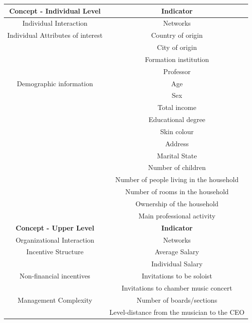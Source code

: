 \documentclass[a4paper, 12pt, openright, oneside, german, french, brazil, english]{abntex2}
\begin{document}
\begin{table}
{\begin{tabular}{|c|c|}
			\hline
			\textbf{Concept - Individual Level} & \textbf{Indicator} \\
			\hline
                   Individual Interaction & Networks \\
			\hline
			Individual Attributes of interest & Country of origin  \\
                                         & City of origin  \\
                                         & Formation institution \\
                                         & Professor    \\
                   \hline
                   Demographic information & Age \\
                                         & Sex \\
                                         & Total income \\
                                         & Educational degree \\
                                         & Skin colour \\
                                         & Address \\
                                         & Marital State \\
                                         & Number of children \\
                                         & Number of people living in the household \\
                                         & Number of rooms in the household \\
                                         & Ownership of the household \\
                                         & Main professional activity \\
                   \hline
                   \textbf{Concept - Upper Level} & \textbf{Indicator} \\
                   \hline
                   Organizational Interaction & Networks \\
                   \hline
                   Incentive Structure & Average Salary \\
                                                            & Individual Salary \\
                   \hline
                   Non-financial incentives & Invitations to be soloist \\
                                                            & Invitations to chamber music concert \\
			\hline
			Management Complexity  & Number of boards/sections  \\
			& Level-distance from the musician to the CEO \\
			\hline
					
			\end{tabular}
		}
		{}
        \end{table}
\end{document}
